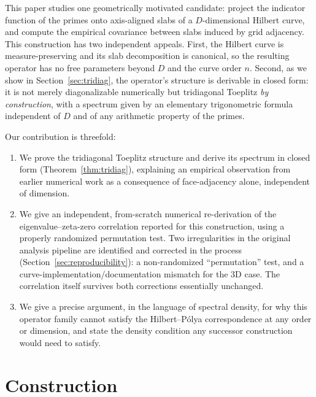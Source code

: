 \documentclass[11pt,a4paper]{article}
\begin{document}
This paper studies one geometrically motivated candidate: project the
indicator function of the primes onto axis-aligned slabs of a
$D$-dimensional Hilbert curve, and compute the empirical covariance between
slabs induced by grid adjacency. This construction has two independent
appeals. First, the Hilbert curve is measure-preserving and its
slab decomposition is canonical, so the resulting operator has no free
parameters beyond $D$ and the curve order $n$. Second, as we show in
Section~\ref{sec:tridiag}, the operator's structure is derivable in closed
form: it is not merely diagonalizable numerically but tridiagonal Toeplitz
\emph{by construction}, with a spectrum given by an elementary trigonometric
formula independent of $D$ and of any arithmetic property of the primes.

Our contribution is threefold:

\begin{enumerate}
\item We prove the tridiagonal Toeplitz structure and derive its spectrum in
   closed form (Theorem~\ref{thm:tridiag}), explaining an empirical
   observation from earlier numerical work \cite{wesson2026a} as a
   consequence of face-adjacency alone, independent of dimension.
\item We give an independent, from-scratch numerical re-derivation of the
   eigenvalue--zeta-zero correlation reported for this construction, using a
   properly randomized permutation test. Two irregularities in the original
   analysis pipeline are identified and corrected in the process
   (Section~\ref{sec:reproducibility}): a non-randomized ``permutation''
   test, and a curve-implementation/documentation mismatch for the 3D case.
   The correlation itself survives both corrections essentially unchanged.
\item We give a precise argument, in the language of spectral density, for
   why this operator family cannot satisfy the Hilbert--P\'{o}lya
   correspondence at any order or dimension, and state the density
   condition any successor construction would need to satisfy.
\end{enumerate}

\section{Construction}
\end{document}
